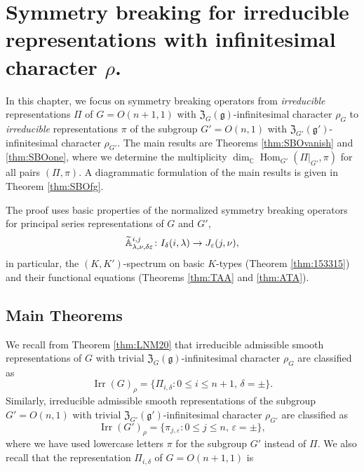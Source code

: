\newpage
\section
{Symmetry breaking for irreducible representations
 with infinitesimal character $\rho$.}
\label{sec:SBOrho}

In this chapter, 
 we focus on symmetry breaking operators from 
 {\it{irreducible}} representations $\Pi$ of $G=O(n+1,1)$
 with 
${\mathfrak{Z}}_G({\mathfrak{g}})$-infinitesimal character
 $\rho_G$ 
 to {\it{irreducible}} representations $\pi$ of the subgroup $G'=O(n,1)$
 with ${\mathfrak{Z}}_{G'}({\mathfrak{g}}')$-infinitesimal character
 $\rho_{G'}$.  
The main results are Theorems \ref{thm:SBOvanish} and \ref{thm:SBOone}, 
 where we determine the multiplicity 
 $\dim_{\mathbb{C}}{\operatorname{Hom}}_{G'}(\Pi|_{G'}, \pi)$
 for all pairs $(\Pi,\pi)$.  
A diagrammatic formulation 
 of the main results is given in Theorem \ref{thm:SBOfg}.  



The proof uses basic properties
 of the normalized symmetry breaking operators
 for principal series representations
 of $G$ and $G'$, 
\begin{equation*}
{\widetilde{\mathbb{A}}}_{{\lambda},{\nu},{\delta \varepsilon}}^{{i,j}} \colon 
I_{\delta}(i,\lambda)  \rightarrow J_{\varepsilon}(j,\nu), 
\end{equation*}
in particular, 
 the $(K,K')$-spectrum 
 on basic $K$-types (Theorem \ref{thm:153315})
 and  their functional equations
 (Theorems \ref{thm:TAA} and \ref{thm:ATA}).



\subsection{Main Theorems} 
We recall from Theorem \ref{thm:LNM20}
 that irreducible admissible smooth representations of $G$ 
 with trivial
 ${\mathfrak {Z}}_G({\mathfrak {g}})$-infinitesimal character
 $\rho_G$
 are classified as
\[
    {\operatorname{Irr}}(G)_{\rho}
   =
  \{
    \Pi_{i, \delta}
    :
    0 \le i \le n+1, \, \delta = \pm
\}.  
\]
Similarly,
 irreducible admissible smooth representations
 of the subgroup $G'=O(n,1)$
 with trivial ${\mathfrak {Z}}_{G'}({\mathfrak {g}}')$-infinitesimal character
 $\rho_{G'}$
 are classified as 
\[
  {\operatorname{Irr}}(G')_{\rho}
  =
  \{
  \pi_{j, \varepsilon}
    :
    0 \le j \le n, \, \varepsilon = \pm
\},   
\]
where we have used lowercase letters $\pi$
 for the subgroup $G'$ instead of $\Pi$.  
We also recall that the representation $\Pi_{i, \delta}$ of $G=O(n+1,1)$
 is 

